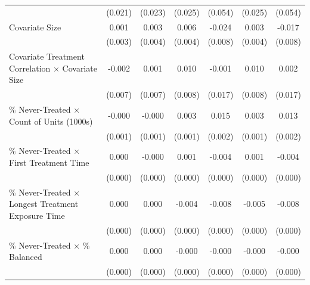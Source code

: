 \documentclass[12pt]{article}
\begin{document}
\begin{table}[htbp]
{\begin{tabular}{p{4.5in}|*{6}{c}}
                    &     (0.021)         &     (0.023)         &     (0.025)         &     (0.054)         &     (0.025)         &     (0.054)         \\
Covariate Size      &       0.001         &       0.003         &       0.006         &      -0.024\sym{**} &       0.003         &      -0.017\sym{*}  \\
                    &     (0.003)         &     (0.004)         &     (0.004)         &     (0.008)         &     (0.004)         &     (0.008)         \\
Covariate Treatment Correlation $\times$ Covariate Size&      -0.002         &       0.001         &       0.010         &      -0.001         &       0.010         &       0.002         \\
                    &     (0.007)         &     (0.007)         &     (0.008)         &     (0.017)         &     (0.008)         &     (0.017)         \\
\% Never-Treated $\times$ Count of Units (1000s)&      -0.000         &      -0.000         &       0.003\sym{***}&       0.015\sym{***}&       0.003\sym{***}&       0.013\sym{***}\\
                    &     (0.001)         &     (0.001)         &     (0.001)         &     (0.002)         &     (0.001)         &     (0.002)         \\
\% Never-Treated $\times$ First Treatment Time&       0.000         &      -0.000         &       0.001\sym{***}&      -0.004\sym{***}&       0.001\sym{***}&      -0.004\sym{***}\\
                    &     (0.000)         &     (0.000)         &     (0.000)         &     (0.000)         &     (0.000)         &     (0.000)         \\
\% Never-Treated $\times$ Longest Treatment Exposure Time&       0.000         &       0.000\sym{***}&      -0.004\sym{***}&      -0.008\sym{***}&      -0.005\sym{***}&      -0.008\sym{***}\\
                    &     (0.000)         &     (0.000)         &     (0.000)         &     (0.000)         &     (0.000)         &     (0.000)         \\
\% Never-Treated $\times$ \% Balanced&       0.000\sym{***}&       0.000\sym{**} &      -0.000\sym{*}  &      -0.000         &      -0.000\sym{*}  &      -0.000         \\
                    &     (0.000)         &     (0.000)         &     (0.000)         &     (0.000)         &     (0.000)         &     (0.000)         \\

\end{tabular}}
\end{table}
\end{document}
